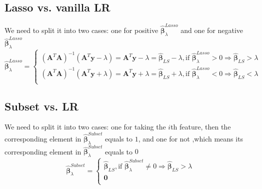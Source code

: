 \documentclass[11pt]{article}
\newcommand{\mtx}[1]{\mathbf{#1}}
\newcommand{\vct}[1]{\mathbf{#1}}
\def \mA {\mtx{A}}
\def \vy {\vct{y}}
\begin{document}
\subsection{Lasso vs. vanilla LR}
We need to split it into two cases: one for positive $\hat{\bm{\beta}}_\lambda^{Lasso}$ and one for negative $\hat{\bm{\beta}}_\lambda^{Lasso}$
\begin{equation}
	\hat{\bm{\beta}}_\lambda^{Lasso} = 
	\left\{
		\begin{aligned}
			(\mA^T\mA)^{-1}(\mA^T\vy-\lambda) = \mA^T\vy-\lambda = \hat{\bm{\beta}}_{LS}-\lambda,  
			\text{if } \hat{\bm{\beta}}_\lambda^{Lasso}>0\Rightarrow \hat{\bm{\beta}}_{LS} > \lambda\\
			(\mA^T\mA)^{-1}(\mA^T\vy+\lambda) = \mA^T\vy+\lambda = \hat{\bm{\beta}}_{LS}+\lambda,  
			\text{if } \hat{\bm{\beta}}_\lambda^{Lasso}<0\Rightarrow\hat{\bm{\beta}}_{LS} < \lambda\\
		\end{aligned}
	\right.
\end{equation}
\subsection{Subset vs. LR}
We need to split it into two cases: one for taking the $i$th feature, then the corresponding element in 
$\hat{\bm{\beta}}_\lambda^{Subset}$ equals to $1$,  
and one for not ,which means its corresponding element in $\hat{\bm{\beta}}_\lambda^{Subset}$ equals to $0$
\begin{equation}
	\hat{\bm{\beta}}_\lambda^{Subset} = 
	\left\{
		\begin{aligned}
			\hat{\bm{\beta}}_{LS},\text{if } \hat{\bm{\beta}}_\lambda^{Subset}\neq0\Rightarrow \hat{\bm{\beta}}_{LS} > \lambda\\
			\mtx{0}\\
		\end{aligned}
	\right.
\end{equation}

\vspace{4cm}
\end{document}
